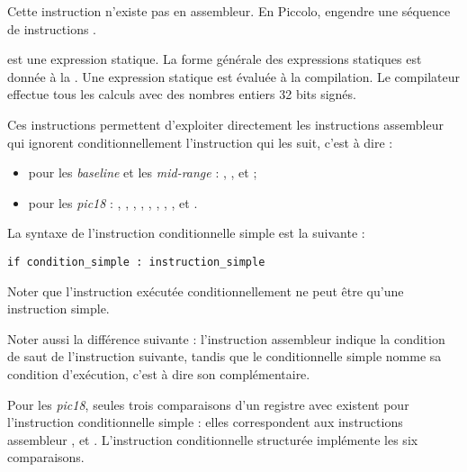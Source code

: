 
Cette instruction n'existe pas en assembleur. En Piccolo,  engendre une séquence de  instructions .

 est une expression statique. La forme générale des expressions statiques est donnée à la . Une expression statique est évaluée à la compilation. Le compilateur effectue tous les calculs avec des nombres entiers 32 bits signés.






Ces instructions permettent d'exploiter directement les instructions assembleur qui ignorent conditionnellement l'instruction qui les suit, c'est à dire :
\begin{itemize}
\item pour les \emph{baseline} et les \emph{mid-range} : , ,  et  ;
\item pour les \emph{pic18} : , , , , , , , ,  et .
\end{itemize}

La syntaxe de l'instruction conditionnelle simple est la suivante :

\begin{lstlisting}[language=piccolo]
if condition_simple : instruction_simple
\end{lstlisting}

Noter que l'instruction exécutée conditionnellement ne peut être qu'une instruction simple.

Noter aussi la différence suivante : l'instruction assembleur indique la condition de saut de l'instruction suivante, tandis que le conditionnelle simple nomme sa condition d'exécution, c'est à dire son complémentaire.

Pour les \emph{pic18}, seules trois comparaisons d'un registre avec  existent pour l'instruction conditionnelle simple : elles correspondent aux instructions assembleur ,  et . L'instruction conditionnelle structurée implémente les six comparaisons.

